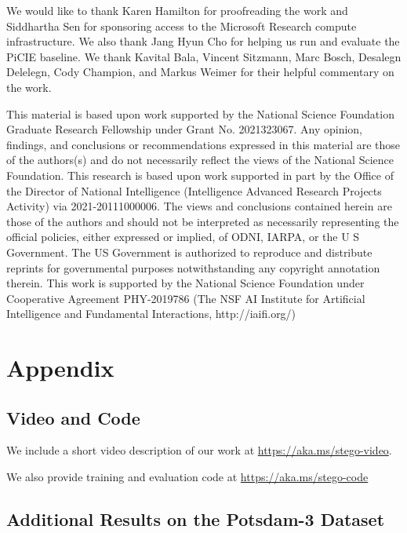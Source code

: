 \documentclass{article} \usepackage{iclr2022_conference,times}
\begin{document}
We would like to thank Karen Hamilton for proofreading the work and Siddhartha Sen for sponsoring access to the Microsoft Research compute infrastructure. We also thank Jang Hyun Cho for helping us run and evaluate the PiCIE baseline. We thank Kavital Bala, Vincent Sitzmann, Marc Bosch, Desalegn Delelegn, Cody Champion, and Markus Weimer for their helpful commentary on the work.

This material is based upon work supported by the National Science Foundation Graduate Research Fellowship under Grant No. 2021323067. Any opinion, findings, and conclusions or recommendations expressed in this material are those of the authors(s) and do not necessarily reflect the views of the National Science Foundation. This research is based upon work supported in part by the Office of the Director of National Intelligence (Intelligence Advanced Research Projects Activity) via 2021-20111000006. The views and conclusions contained herein are those of the authors and should not be interpreted as necessarily representing the official policies, either expressed or implied, of ODNI, IARPA, or the U S Government. The US Government is authorized to reproduce and distribute reprints for governmental purposes notwithstanding any copyright annotation therein. This work is supported by the National Science Foundation under Cooperative Agreement PHY-2019786 (The NSF AI Institute for Artificial Intelligence and Fundamental Interactions, http://iaifi.org/)







\newpage

\appendix
\section{Appendix}

\subsection{Video and Code}

We include a short video description of our work at {\color{blue} \url{https://aka.ms/stego-video}}.

We also provide training and evaluation code at {\color{blue} \url{https://aka.ms/stego-code}}


\subsection{Additional Results on the Potsdam-3 Dataset}
\label{sec:potsdam}
\end{document}
